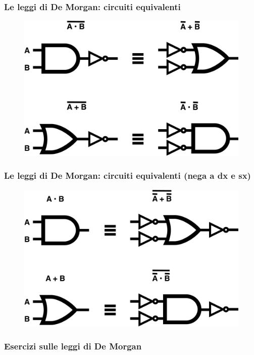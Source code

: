 \begin{frame}
	\frametitle{Le leggi di De Morgan: circuiti equivalenti}

	\begin{figure}[!htbp]
		\centering 
		\includegraphics[width=0.8\linewidth]{images/2_le_architetture/demorgan_1.pdf}
	\end{figure}
	
\end{frame}

\begin{frame}
	\frametitle{Le leggi di De Morgan: circuiti equivalenti (nega a dx e sx)}
	
	\begin{figure}[!htbp]
		\centering 
		\includegraphics[width=0.8\linewidth]{images/2_le_architetture/demorgan_2.pdf}
	\end{figure}
\end{frame}


\begin{frame}
	\frametitle{Esercizi sulle leggi di De Morgan}

	
	
\end{frame}


